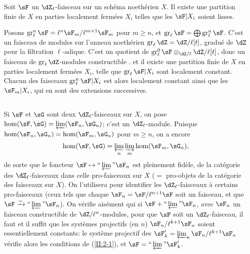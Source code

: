 \begin{proposition_}\label{II:2-5}
Soit $\sF$ un $\dZ_\ell$-faisceau sur un schéma noethérien $X$. Il existe 
une partition finie de $X$ en parties localement fermées $X_i$ telles que 
les $\sF|X_i$ soient lisses.
\end{proposition_}

Posons $\gr_\ell^n\sF=\ell^n\sF_m/\ell^{m+1}\sF_m$ pour $m\geqslant n$, et 
$\gr_\ell\sF=\bigoplus \gr_\ell^n\sF$. C'est un faisceau de modules sur 
l'anneau noethérien $\gr_\ell\dZ=\dZ/\ell[t]$, gradué de $\dZ$ pour la 
filtration $\ell$-adique. C'est un quotient de 
$\gr_\ell^0\sF \otimes_{\dZ/\ell} \dZ/\ell[t]$, donc un faisceau de 
$\gr_\ell\dZ$-modules constructible \cite[IX.2]{sga4}. et il existe une partition 
finie de $X$ en parties localement fermées $X_i$, telle que 
$\gr_\ell \sF|X_i$ sont localement constant. Chacun des faisceaux 
$\gr_\ell^n\sF|X_i$ est alors localement constant ainsi que les $\sF_m|X_i$, 
qui en sont des extensions successives. 





\subsection{}\label{II:2-6}

Si $\sF$ et $\sG$ sont deux $\dZ_\ell$-faisceaux sur $X$, on pose 
$\hom(\sF,\sG) = \varprojlim(\sF_n,\sG_n)$; c'est un $\dZ_\ell$-module. 
Puisque $\hom(\sF_n,\sG_n) = \hom(\sF_m,\sG_n)$ pour $m\geqslant n$, on a 
encore 
\[
  \hom(\sF,\sG) = \varprojlim_n \varinjlim_m \hom(\sF_m,\sG_n) \text{,}
\]
de sorte que le foncteur $\sF\mapsto \text{``}\varprojlim\text{''}\sF_n$ est 
pleinement fidèle, de la catégorie des $\dZ_\ell$-faisceaux dans celle 
pro-faisceaux sur $X$ ($=$ pro-objets de la catégorie des faisceaux sur $X$). 
On l'utilisera pour identifier les $\dZ_\ell$-faisceaux à certains 
pro-faisceaux (ceux tels que chaque $\sF_n=\sF/\ell^{n+1}\sF$ soit un faisceau, 
et que $\sF\iso \text{``}\varprojlim\text{''}\sF_n$). On vérifie aisément 
qui si $\sF+\text{``}\varprojlim\text{''}\sF_n$, avec $\sF_n$ un faisceau 
constructible de $\dZ/\ell^n$-modules, pour que $\sF$ soit un 
$\dZ_\ell$-faisceau, il faut et il suffit que les systèmes projectifs (en $n$) 
$\sF_n/\ell^{k+1}\sF_n$ soient essentiellement constants: le système 
projectif des $\sF_k'=\varprojlim_n\sF_n/\ell^{k+1}\sF_n$ vérifie alors les 
conditions de (\ref{II:2-1}), et $\sF=\text{``}\varprojlim\text{''}\sF_k'$. 

